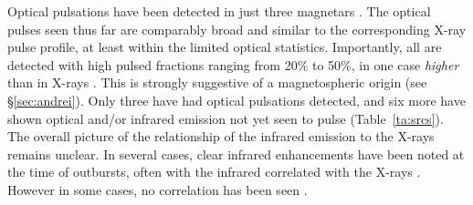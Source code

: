 Optical pulsations have been detected in just three magnetars \citep{km02,dmh+05,dml+09,dml+11}. 
The optical pulses seen thus far are comparably broad and similar to the corresponding X-ray pulse
profile, at least within the limited optical statistics. 
Importantly, all are detected with high pulsed
fractions ranging from 20\% to 50\%, in one case {\it higher} than in X-rays \citep{dml+11}. 
This is strongly suggestive of a magnetospheric origin (see \S\ref{sec:andrei}).
Only three have had optical pulsations detected, and six more have shown optical and/or infrared emission not
yet seen to pulse (Table~\ref{ta:srcs}).  
The overall picture of the relationship of the infrared emission to the X-rays remains unclear.
In several cases, clear infrared enhancements have been noted at the time of outbursts, often
with the infrared correlated with the X-rays \citep{tkvd04,icm+05,rtv+04}.
However in some cases, no correlation has been seen \citep{dk06,trm+08,wbk+08,tgd+08}.


